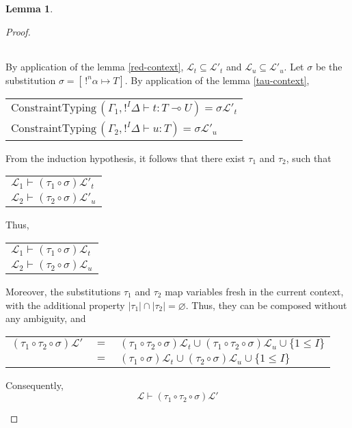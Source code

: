 \documentclass[10pt]{article}
\theoremstyle{plain}
\theoremstyle{definition}
\newtheorem{lemma}{Lemma}[section]
\begin{document}
\begin{lemma}
\begin{proof}
\begin{itemize}
\begin{center}
\begin{tabular}{l}
			 		\end{tabular}
			 		\end{center}
			 	By application of the lemma \ref{red-context}, $\mathcal{L}_t \subseteq \mathcal{L'}_t$ and $\mathcal{L}_u \subseteq \mathcal{L'}_u$.
			 	Let $\sigma$ be the substitution $\sigma = [\, !^n\alpha \mapsto T]$. By application of the lemma \ref{tau-context}, 
			 		\begin{center}
			 		\begin{tabular}{l}
			 			$\text{ConstraintTyping} \, (\Gamma_1, !^I \Delta \vdash t : T \multimap U) = \sigma \mathcal{L'}_t$ \\
			 			$\text{ConstraintTyping} \, (\Gamma_2, !^I \Delta \vdash u : T) = \sigma \mathcal{L'}_u$
			 		\end{tabular}
			 		\end{center}
			 	From the induction hypothesis, it follows that there exist $\tau_1$ and $\tau_2$, such that
			 		\begin{center}
			 		\begin{tabular}{l}
			 			$\mathcal{L}_1 \vdash (\tau_1 \circ \sigma) \mathcal{L'}_t$ \\
			 			$\mathcal{L}_2 \vdash (\tau_2 \circ \sigma) \mathcal{L'}_u$
			 		\end{tabular}
			 		\end{center}
			 	Thus,
			 		\begin{center}
			 		\begin{tabular}{l}
			 			$\mathcal{L}_1 \vdash (\tau_1 \circ \sigma) \mathcal{L}_t$ \\
			 			$\mathcal{L}_2 \vdash (\tau_2 \circ \sigma) \mathcal{L}_u$
			 		\end{tabular}
			 		\end{center}
			 	Moreover, the substitutions $\tau_1$ and $\tau_2$ map variables fresh in the current context, with the
			 	additional property $|\tau_1| \cap |\tau_2| = \varnothing$. Thus, they can be composed without any ambiguity, and
			 		\begin{center}
			 		\begin{tabular}{lcl}
			 			$(\tau_1 \circ \tau_2 \circ \sigma) \mathcal{L'}$ & $=$ & 
				 			$(\tau_1 \circ \tau_2 \circ \sigma) \mathcal{L}_t \cup (\tau_1 \circ \tau_2 \circ \sigma) \mathcal{L}_u \cup \{1 \le I\}$ \\
				 		& $=$ & $(\tau_1 \circ \sigma) \mathcal{L}_t \cup (\tau_2 \circ \sigma) \mathcal{L}_u \cup \{1 \le I\}$
			 		\end{tabular}
			 		\end{center}
			 	Consequently,
			 		$$ \mathcal{L} \vdash (\tau_1 \circ \tau_2 \circ \sigma) \mathcal{L'} $$
			 		

\end{itemize}
\end{proof}
\end{lemma}
\end{document}
